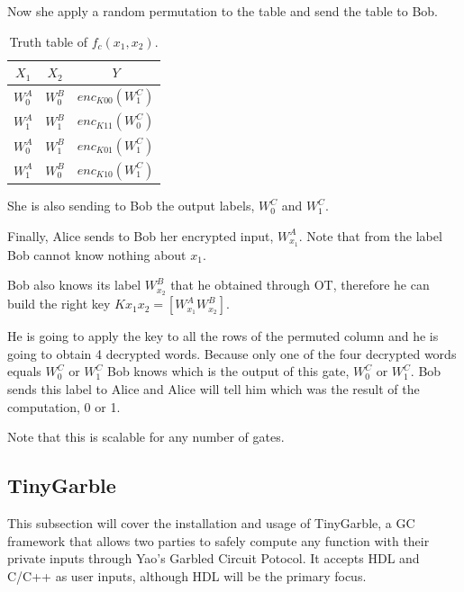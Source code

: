 \begin{refsection}
Now she apply a random permutation to the table and send the table to Bob.

\begin{table}[H]
\centering
\begin{tabular}{|c|c|c|}
\hline
$X_1$                 & $X_2$                   & $Y$  \\ \hline
$W_0^A$               & $W_0^B$                 & $enc_{K00} \left(W_1^C\right)$    \\ \hline
$W_1^A$               & $W_1^B$                 & $enc_{K11} \left(W_0^C\right)$    \\ \hline
$W_0^A$               & $W_1^B$                 & $enc_{K01} \left(W_1^C\right)$    \\ \hline
$W_1^A$               & $W_0^B$                 & $enc_{K10} \left(W_1^C\right)$    \\ \hline
\end{tabular}
\caption{Truth table of $f_c(x_1,x_2)$.}\label{tb:truthtable}
\end{table}

She is also sending to Bob the output labels, $W_0^C$ and $W_1^C$.

Finally, Alice sends to Bob her encrypted input, $W_{x_1}^A$. Note that from the label Bob cannot know nothing about $x_1$.

Bob also knows its label $W_{x_2}^B$ that he obtained through OT, therefore he can build the right key $Kx_1x_2 = \left[ W_{x_1}^A W_{x_2}^B\right]$.

He is going to apply the key to all the rows of the permuted column and he is going to obtain 4 decrypted words.
Because only one of the four decrypted words equals $W_0^C$ or $W_1^C$ Bob knows which is the output of this gate, $W_0^C$ or $W_1^C$.
Bob sends this label to Alice and Alice will tell him which was the result of the computation, 0 or 1.

Note that this is scalable for any number of gates.

\newpage

\subsection{TinyGarble}

This subsection will cover the installation and usage of TinyGarble, a GC framework that allows two parties to safely compute any function with their private inputs through Yao's Garbled Circuit Potocol. It accepts HDL and C/C++ as user inputs, although HDL will be the primary focus.


\end{refsection}

